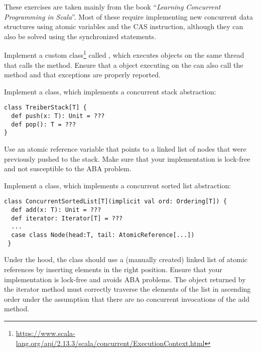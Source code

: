 \documentclass[11pt]{article}
\begin{document}
\myHeader

These exercises are taken mainly from the book ``\emph{Learning Concurrent Programming in Scala}''.
%
Most of these require implementing new concurrent data structures using atomic variables and the CAS instruction, although they can also be solved using the synchronized statements.


\begin{myExercise}
Implement a custom  class\footnote{\url{https://www.scala-lang.org/api/2.13.3/scala/concurrent/ExecutionContext.html}} called , which executes  objects on the same thread that calls the  method. Ensure that a  object executing on the  can also call the  method and that exceptions are properly reported.
\end{myExercise}

\begin{myExercise}
Implement a  class, which implements a concurrent stack abstraction:
\begin{lstlisting}
class TreiberStack[T] {
  def push(x: T): Unit = ???
  def pop(): T = ???
}
\end{lstlisting}
Use an atomic reference variable that points to a linked list of nodes that were previously pushed to the stack. Make sure that your implementation is lock-free and not susceptible to the ABA problem.
\end{myExercise}

\begin{myExercise}
Implement a  class, which implements a concurrent sorted list abstraction:
\begin{lstlisting}
class ConcurrentSortedList[T](implicit val ord: Ordering[T]) {
  def add(x: T): Unit = ???
  def iterator: Iterator[T] = ???
  ...
  case class Node(head:T, tail: AtomicReference[...])
 }
\end{lstlisting}
Under the hood, the  class should use a (manually created) linked list of atomic references by inserting elements in the right position. Ensure that your implementation is lock-free and avoids ABA problems.
The  object returned by the iterator method must correctly traverse the elements of the list in ascending order under the assumption that there are no concurrent invocations of the add method.
\end{myExercise}
\end{document}

